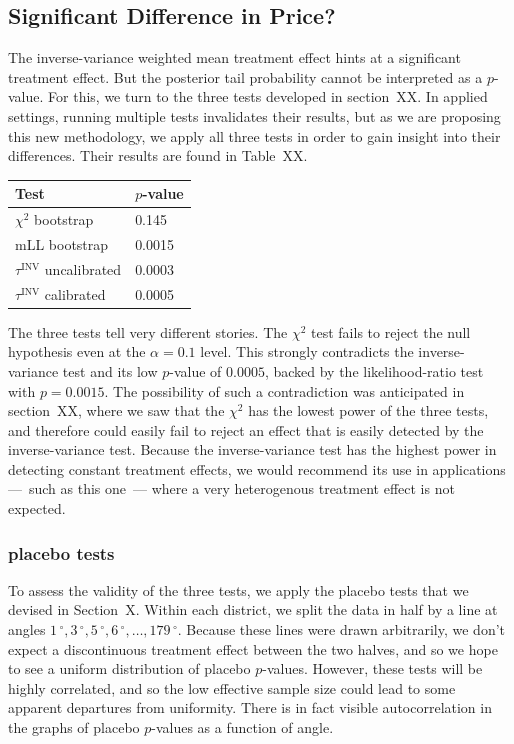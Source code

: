 \documentclass[letter]{article}
\newcommand{\invvar}{\tau^{\mathrm{INV}}}
\newcommand{\degree}{{\,^\circ}}
\begin{document}
    	\subsection{Significant Difference in Price?}\label{significant-difference-in-price}

The inverse-variance weighted mean treatment effect hints at a significant treatment effect.
But the posterior tail probability cannot be interpreted as a \(p\)-value.
For this, we turn to the three tests developed in section~XX.
In applied settings, running multiple tests invalidates their results,
but as we are proposing this new methodology,
we apply all three tests in order to gain insight into their differences.
Their results are found in Table~XX.

\begin{longtable}[]{@{}ll@{}}
\toprule
Test & \(p\)-value\tabularnewline
\midrule
\endhead
\(\chi^2\) bootstrap & 0.145\tabularnewline
mLL bootstrap & 0.0015\tabularnewline
\(\invvar\) uncalibrated & 0.0003\tabularnewline
\(\invvar\) calibrated & 0.0005\tabularnewline
\bottomrule
\end{longtable}

The three tests tell very different stories.
The \(\chi^2\) test fails to reject the null hypothesis even at the \(\alpha=0.1\) level.
This strongly contradicts the inverse-variance test and its low \(p\)-value of \(0.0005\),
backed by the likelihood-ratio test with \(p=0.0015\).
The possibility of such a contradiction was anticipated in section~XX, where we saw that the \(\chi^2\) has the lowest power of the three tests, and therefore could easily fail to reject an effect that is easily detected by the inverse-variance test.
Because the inverse-variance test has the highest power in detecting constant treatment effects, we would recommend its use in applications ---~such as this one~--- where a very heterogenous treatment effect is not expected.
    


    	\subsubsection{placebo tests}\label{placebo-tests}

To assess the validity of the three tests, we apply the placebo tests that we devised in Section~X.
Within each district, we split the data in half by a line at angles \(1\degree,3\degree,5\degree,6\degree,\ldots,179\degree\).
Because these lines were drawn arbitrarily, we don't expect a discontinuous treatment effect between the two halves, and so we hope to see a uniform distribution of placebo \(p\)-values.
However, these tests will be highly correlated,
and so the low effective sample size could lead to some apparent departures from uniformity.
There is in fact visible autocorrelation in the graphs of placebo \(p\)-values as a function of angle.
\end{document}
